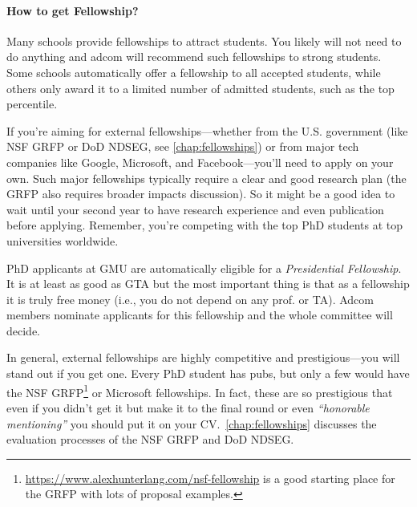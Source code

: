 \documentclass[oneside,11pt]{book}
\newenvironment{commentbox}[1][]{
  \small
  \begin{marker}[\faChessPawn{}]
    {\textbf{#1}}
  }{
  \end{marker}
}
\begin{document}
\paragraph{How to get Fellowship?}   Many schools provide fellowships to attract students. You likely will not need to do anything and adcom will recommend such fellowships to strong students. Some schools automatically offer a fellowship to all accepted students, while others only award it to a limited number of admitted students, such as the top percentile.

If you're aiming for external fellowships---whether from the U.S. government (like NSF GRFP or DoD NDSEG, see \autoref{chap:fellowships}) or from major tech companies like Google, Microsoft, and Facebook---you’ll need to apply on your own.
Such major fellowships typically require a clear and good research plan (the GRFP also requires broader impacts discussion). So it might be a good idea to wait until your second year to have research experience and even publication before applying. Remember, you're competing with the top PhD students at top universities worldwide.

\begin{commentbox}
  PhD applicants at GMU are automatically eligible for a \emph{Presidential Fellowship}.  It is at least as good as GTA but the most important thing is that as a fellowship it is truly free money (i.e., you do not depend on any prof. or TA).  Adcom members nominate applicants for this fellowship and the whole committee will decide.
\end{commentbox}


In general, external fellowships are highly competitive and prestigious---you will stand out if you get one.  Every PhD student has pubs, but only a few would have the NSF GRFP\footnote{\url{https://www.alexhunterlang.com/nsf-fellowship} is a good starting place for the GRFP with lots of proposal examples.} or Microsoft fellowships. In fact, these are so prestigious that even if you didn't get it but make it to the final round or even \emph{``honorable mentioning''} you should put it on your CV.~\autoref{chap:fellowships} discusses the evaluation processes of the NSF GRFP and DoD NDSEG.
\end{document}
